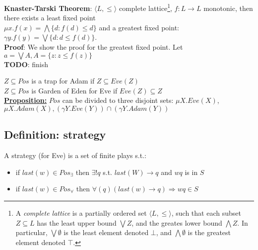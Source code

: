\textbf{Knaster-Tarski Theorem}: $\langle L, \le \rangle$ complete lattice\footnote{
	A \textit{complete lattice} is a partially ordered set $\langle L, \leq \rangle$, such that
	each subset $Z \subseteq L$ has the least upper bound $\bigvee Z$, and the greates lower
	bound $\bigwedge Z$. In particular, $\bigvee \emptyset$ is the least element denoted $\bot$,
	and $\bigwedge \emptyset$ is the greatest element denoted $\top$.
}, $f : L \rightarrow L$ monotonic,
then there exists a least fixed point\\
$\mu x. f(x) = \bigwedge \{d : f(d) \leq d\}$ and a greatest fixed point:\\
$\gamma y. f(y) = \bigvee \{d : d \leq f(d) \}$.\\
\textbf{Proof}: We show the proof for the greatest fixed point. Let $a = \bigvee A, A = \{z : z \leq f(z)\}$\\
\textbf{TODO}: finish

\noindent
$Z \subseteq Pos$ is a trap for Adam if $Z \subseteq Eve(Z)$\\
$Z \subseteq Pos$ is Garden of Eden for Eve if $Eve(Z) \subseteq Z$\\

\noindent
\underline{\textbf{Proposition:}} $Pos$ can be divided to three disjoint sets:
$\mu X. Eve(X)$, $\mu X. Adam(X), (\gamma Y. Eve(Y)) \cap (\gamma Y. Adam(Y))$

\subsection*{Definition: strategy}
A strategy (for Eve) is a set of finite plays s.t.:
\begin{itemize}
	\item if $last(w) \in Pos_{\exists}$ then $\exists! q$ s.t. $last(W) \rightarrow q$ and $wq$ is in $S$
	\item if $last(w) \in Pos_{\forall}$ then $\forall(q) (last(w) \rightarrow q) \Rightarrow wq \in S$
\end{itemize}
